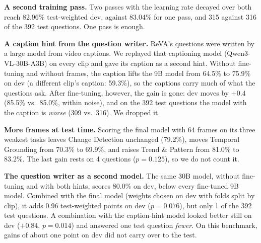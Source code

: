 \textbf{A second training pass.} Two passes with the learning rate decayed
over both reach 82.96\% test-weighted dev, against 83.04\% for one pass,
and 315 against 316 of the 392 test questions. One pass is enough.

\textbf{A caption hint from the question writer.} ReVA's questions were
written by a large model from video captions. We replayed that captioning
model (Qwen3-VL-30B-A3B) on every clip and gave its caption as a second
hint. Without fine-tuning and without frames, the caption lifts the 9B
model from 64.5\% to 75.9\% on dev (a different clip's caption: 59.3\%),
so the captions carry much of what the questions ask. After fine-tuning,
however, the gain is gone: dev moves by $+0.4$ (85.5\% vs.\ 85.0\%, within
noise), and on the 392 test questions the model with the caption is
\emph{worse} (309 vs.\ 316). We dropped it.

\textbf{More frames at test time.} Scoring the final model with 64 frames
on its three weakest tasks leaves Change Detection unchanged (79.2\%),
moves Temporal Grounding from 70.3\% to 69.9\%, and raises Trend \& Pattern
from 81.0\% to 83.2\%. The last gain rests on 4 questions ($p{=}0.125$), so
we do not count it.

\textbf{The question writer as a second model.} The same 30B model,
without fine-tuning and with both hints, scores 80.0\% on dev, below every
fine-tuned 9B model. Combined with the final model (weights chosen on dev
with folds split by clip), it adds 0.96 test-weighted points on dev
($p{=}0.076$), but only 1 of the 392 test questions. A combination with the
caption-hint model looked better still on dev ($+0.84$, $p{=}0.014$) and
answered one test question \emph{fewer}. On this benchmark, gains of about
one point on dev did not carry over to the test.
